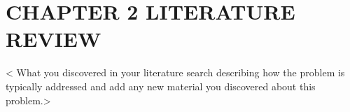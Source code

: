 \chapter[LITERATURE REVIEW]{\hfill CHAPTER 2 \hfill\null\vskip15pt LITERATURE REVIEW}

{\textless} What you discovered in your literature search describing how the problem is typically addressed and add any new material you discovered about this problem.{\textgreater}
